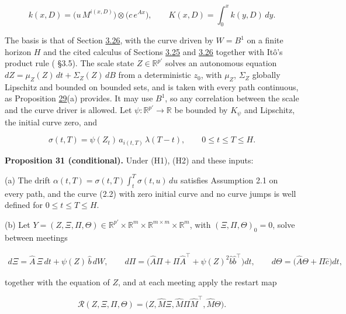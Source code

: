 \documentclass[11pt]{article}
\begin{document}
\begin{equation*}
k(x,D)=\bigl(u\,M^{i(x,D)}\bigr)\otimes\bigl(c\,e^{Ax}\bigr),\qquad K(x,D)=\int_0^xk(y,D)\,dy. \tag{3.142}\label{eq:3.142}
\end{equation*}

The basis is that of Section \hyperref[sec:3.26]{3.26}, with the curve driven by \(W=B^1\) on a finite horizon \(H\) and the cited calculus of Sections \hyperref[sec:3.25]{3.25} and \hyperref[sec:3.26]{3.26} together with Itô's product rule (\cite{bauerschmidt2020stochastic} §3.5). The scale state \(Z\in\mathbb R^{p'}\) solves an autonomous equation \(dZ=\mu_Z(Z)\,dt+\Sigma_Z(Z)\,dB\) from a deterministic \(z_0\), with \(\mu_Z\), \(\Sigma_Z\) globally Lipschitz and bounded on bounded sets, and is taken with every path continuous, as Proposition \hyperref[res:Proposition-29]{29}(a) provides. It may use \(B^1\), so any correlation between the scale and the curve driver is allowed. Let \(\psi:\mathbb R^{p'}\to\mathbb R\) be bounded by \(K_\psi\) and Lipschitz, the initial curve zero, and

\begin{equation*}
\sigma(t,T)=\psi(Z_t)\,a_{i(t,T)}\,\lambda(T-t),\qquad 0\le t\le T\le H. \tag{3.143}\label{eq:3.143}
\end{equation*}

\label{res:Proposition-31}
\textbf{Proposition 31 (conditional).} Under (H1), (H2) and these inputs:

(a) The drift \(\alpha(t,T)=\sigma(t,T)\int_t^T\sigma(t,u)\,du\) satisfies Assumption 2.1 on every path, and the curve (2.2) with zero initial curve and no curve jumps is well defined for \(0\le t\le T\le H\).

(b) Let \(Y=(Z,\Xi,\Pi,\Theta)\in\mathbb R^{p'}\times\mathbb R^m\times\mathbb R^{m\times m}\times\mathbb R^m\), with \((\Xi,\Pi,\Theta)_0=0\), solve between meetings

\begin{equation*}
\begin{gathered}
d\Xi=\hat A\,\Xi\,dt+\psi(Z)\,\hat b\,dW,\qquad d\Pi=\bigl(\hat A\Pi+\Pi\hat A^\top+\psi(Z)^2\hat b\hat b^\top\bigr)dt,\qquad d\Theta=\bigl(\hat A\Theta+\Pi\hat c\bigr)dt,
\end{gathered} \tag{3.144}\label{eq:3.144}
\end{equation*}

together with the equation of \(Z\), and at each meeting apply the restart map

\begin{equation*}
\mathcal R(Z,\Xi,\Pi,\Theta)=\bigl(Z,\hat M\Xi,\hat M\Pi\hat M^\top,\hat M\Theta\bigr). \tag{3.145}\label{eq:3.145}
\end{equation*}
\end{document}

